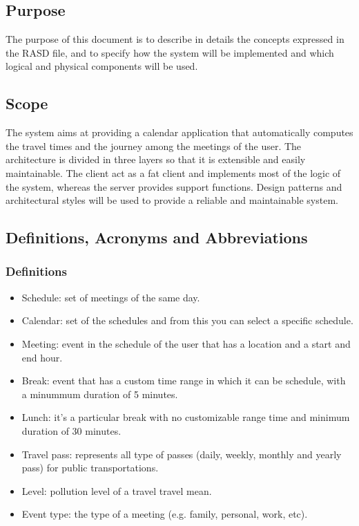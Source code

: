\subsection{Purpose}
The purpose of this document is to describe in details the concepts expressed in the RASD file, and to specify how the system will be implemented and which logical and physical components will be used.

\subsection{Scope}
The system aims at providing a calendar application that automatically computes the travel times and the journey among the meetings of the user.
The architecture is divided in three layers so that it is extensible and easily maintainable.
The client act as a fat client and implements most of the logic of the system, whereas the server provides support functions.
Design patterns and architectural styles will be used to provide a reliable and maintainable system.

\subsection{Definitions, Acronyms and Abbreviations}

\subsubsection{Definitions}
\begin{itemize}
\renewcommand\labelitemi{-}
\item
Schedule: set of meetings of the same day.
\item
Calendar: set of the schedules and from this you can select a specific schedule.
\item
Meeting: event in the schedule of the user that has a location and a start and end hour.
\item
Break: event that has a custom time range in which it can be schedule, with a minummum duration of 5 minutes.
\item
Lunch: it's a particular break with no customizable range time and minimum duration of 30 minutes.
\item
Travel pass: represents all type of passes (daily, weekly, monthly and yearly pass) for public transportations.
\item
Level: pollution level of a travel travel mean. 
\item
Event type: the type of a meeting (e.g. family, personal, work, etc). 
\end{itemize}



